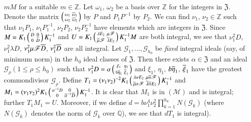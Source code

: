 $mM$ for a suitable $m\in\mathbb{Z}$. Let $\omega_{1}$, $\omega_{2}$
be a basis over $\mathbb{Z}$ for the integers in
$\mathfrak{Z}$. Denote the matrix $\left(\begin{smallmatrix}
  \omega_{1} & \overline{\omega}_{1}\\ \omega_{2} & \overline{\omega}_{2}
\end{smallmatrix}\right)$ by $P$ and $P_{1}P^{-1}$ by $P_{2}$. We can
find $\nu_{1}$, $\nu_{2}\in\mathbb{Z}$ such that $\nu_{1}P_{1}$,
$\nu_{1}P^{-1}_{1}$, $\nu_{2}P_{2}$, $\nu_{2}P^{-1}_{2}$ have elements
which are integers in $\mathfrak{Z}$. Since
$M=K_{1}\left(\begin{smallmatrix} D & \underline{0}\\ 0 & D
\end{smallmatrix}\right)K^{-1}_{1}$ and
$U=K_{1}\left(\begin{smallmatrix} \lambda E_{2} &
  \mu\mathscr{F}\\ \overline{\mu}\mathscr{F} & \overline{\lambda}E_{2}
\end{smallmatrix}\right)K^{-1}_{1}M$ are both integral, we see that
$\nu^{2}_{1}D$, $\nu^{2}_{1}\lambda D$,
$\nu^{2}_{1}\mu\mathscr{F}\overline{D}$, $\nu^{2}_{1}\overline{D}$ are all
integral. Let $\mathscr{G}_{1},\ldots,\mathscr{G}_{h_{0}}$ be {\em
  fixed} integral ideals (say, of minimum norm) in the $h_{0}$ ideal
classes of $\mathfrak{Z}$. Then there exists $\alpha\in \mathfrak{Z}$
and an ideal $\mathscr{G}_{\rho}(1\leq \rho \leq h_{0})$ such that
$\nu^{2}_{1}D=\alpha\left(\begin{smallmatrix} \xi_{1} &
  \eta_{1}\\ \mathfrak{b}\overline{\eta}_{1} & \overline{\xi}_{1}
\end{smallmatrix}\right)$ and $\xi_{1}$, $\eta_{1}$, $b\overline{\eta}_{1}$,
$\overline{\xi}_{1}$ have the greatest common\pageoriginale divisor
$\mathscr{G}_{\rho}$. Define
$T_{1}=(\nu_{1}\nu_{2})^{-2}K_{1}\left(\begin{smallmatrix}
  \lambda\alpha E_{2} &
  \mu\overline{\alpha}\mathscr{F}\\ \overline{\mu}\alpha\mathscr{F} &
  \overline{\lambda}\overline{\alpha}E_{2}\end{smallmatrix}\right)K^{-1}_{1}$ and
$M_{1}=(\nu_{1}\nu_{2})^{2}K_{1}\left(\begin{smallmatrix} \alpha^{-1}D
  & 0\\ 0 &
  \overline{\alpha}^{-1}\overline{D}\end{smallmatrix}\right)K^{-1}_{1}$. It is
clear that $M_{1}$ is in $(\mathscr{M})$ and is integral; further
$T_{1}M_{1}=U$. Moreover, if we define
$d=b\nu^{4}_{1}\nu^{2}_{2}\prod\limits^{h_{0}}_{k=1}N(\mathscr{G}_{k})$
(where $N(\mathscr{G}_{k})$ denotes the norm of $\mathscr{G}_{k}$ over
$\mathbb{Q}$), we see that $dT_{1}$ is integral).

